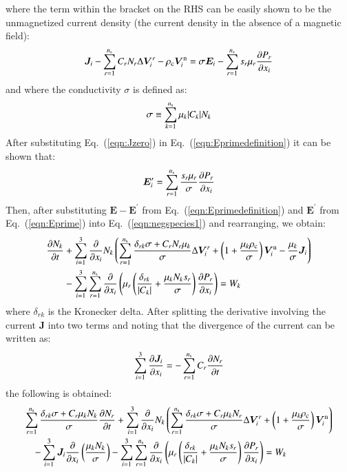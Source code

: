 \documentclass{warpdoc}
\newcommand{\alb}{\vspace{0.1cm}\\} %
\newcommand{\mfd}{\displaystyle}
\newcommand{\ns}{{n_{\rm s}}}
\renewcommand{\vec}[1]{\bm{#1}}
\begin{document}
%
where the term within the bracket on the RHS can be easily shown to be the unmagnetized current density (the current density in the absence of a magnetic field):
%
\begin{equation}
\mfd  \vec{J}_i-\sum_{r=1}^\ns C_r N_r \Delta \vec{V}_i^r  - \rho_{\rm c} \vec{V}_i^{\rm n} =   \sigma \vec{E}_i 
             -  \sum_{r=1}^\ns s_r \mu_r  \frac{\partial P_r}{\partial x_i}
\label{eqn:Jzero}
\end{equation}
%
and where the conductivity $\sigma$ is defined as:
%
\begin{equation}
  \sigma \equiv \sum_{k=1}^\ns \mu_k |C_k| N_k 
\end{equation}
%
After substituting Eq.\ (\ref{eqn:Jzero}) in Eq.\ (\ref{eqn:Eprimedefinition}) it can be shown that:
%
\begin{equation}
   \vec{E}_i^\prime =   
   \sum_{r=1}^\ns \frac{s_r \mu_r }{\sigma}  \frac{\partial P_r}{\partial x_i}
\label{eqn:Eprime}
\end{equation}
%
Then, after substituting $\vec{E}-\vec{E}^\prime$ from Eq.\ (\ref{eqn:Eprimedefinition}) and $\vec{E}^\prime$ from Eq.\ (\ref{eqn:Eprime}) into Eq.\ (\ref{eqn:negspecies1}) and rearranging, we obtain:
%
\begin{align}
  \frac{\partial N_k}{\partial t} 
&+ \sum_{i=1}^3 \frac{\partial}{\partial x_i}   N_k \left(      \sum_{r=1}^\ns \frac{\delta_{rk}\sigma+ C_r N_r \mu_k}{\sigma}   \Delta \vec{V}_i^r +\left(1+\frac{\mu_k \rho_{\rm c}}{\sigma}\right)\vec{V}^{\rm n}_i - \frac{\mu_k}{\sigma}  \vec{J}_i \right)
\nonumber\alb
&- \sum_{i=1}^3 \sum_{r=1}^{\ns} \frac{\partial}{\partial x_i} \left( \mu_r \left( \frac{\delta_{rk}}{|C_k|}+ \frac{ \mu_k N_k s_r }{\sigma} \right) \frac{\partial P_r}{\partial x_i}\right) 
= 
W_k
\end{align}
%
where $\delta_{rk}$ is the Kronecker delta. 
After splitting the derivative involving the current $\vec{J}$ into two terms and noting that the divergence of the current can be written as:
%
\begin{equation}
\sum_{i=1}^3 \frac{\partial \vec{J}_i}{\partial x_i}=-\sum_{r=1}^\ns C_r \frac{\partial N_r}{\partial t}
\end{equation}
%
the following is obtained:
%
\begin{equation}
\begin{array}{l}\mfd
  \sum_{r=1}^{\ns} \frac{\delta_{rk}\sigma+C_r  \mu_k N_k}{\sigma} \frac{\partial N_r}{\partial t}  
+ \sum_{i=1}^3 \frac{\partial}{\partial x_i}   N_k \left(\sum_{r=1}^\ns \frac{\delta_{rk}\sigma+C_r  \mu_k N_r}{\sigma} \Delta \vec{V}_i^r +\left(1+\frac{\mu_k\rho_{\rm c}}{\sigma}\right)\vec{V}^{\rm n}_i\right) 
\alb\mfd~~~~
- \sum_{i=1}^3 \vec{J}_i \frac{\partial}{\partial x_i}  \left( \frac{\mu_k N_k}{\sigma} 
\right) 
- \sum_{i=1}^3 \sum_{r=1}^{\ns} \frac{\partial}{\partial x_i} \left(\mu_r \left(\frac{ \delta_{rk} }{ |C_k|}+   \frac{ \mu_k N_k s_r}{\sigma}\right)  \frac{\partial P_r}{\partial x_i}\right) 
= W_k
\end{array}
\end{equation}
\end{document}
